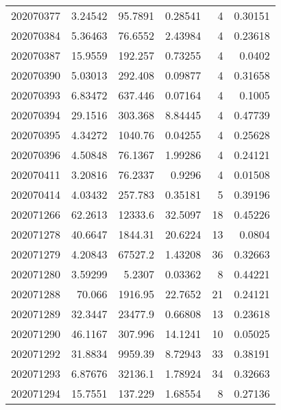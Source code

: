 \begin{tabular}{rrrrrr}
 202070377 &          3.24542 &       95.7891 &            0.28541 &           4 & 0.30151 \\
 202070384 &          5.36463 &       76.6552 &            2.43984 &           4 & 0.23618 \\
 202070387 &         15.9559  &      192.257  &            0.73255 &           4 & 0.0402  \\
 202070390 &          5.03013 &      292.408  &            0.09877 &           4 & 0.31658 \\
 202070393 &          6.83472 &      637.446  &            0.07164 &           4 & 0.1005  \\
 202070394 &         29.1516  &      303.368  &            8.84445 &           4 & 0.47739 \\
 202070395 &          4.34272 &     1040.76   &            0.04255 &           4 & 0.25628 \\
 202070396 &          4.50848 &       76.1367 &            1.99286 &           4 & 0.24121 \\
 202070411 &          3.20816 &       76.2337 &            0.9296  &           4 & 0.01508 \\
 202070414 &          4.03432 &      257.783  &            0.35181 &           5 & 0.39196 \\
 202071266 &         62.2613  &    12333.6    &           32.5097  &          18 & 0.45226 \\
 202071278 &         40.6647  &     1844.31   &           20.6224  &          13 & 0.0804  \\
 202071279 &          4.20843 &    67527.2    &            1.43208 &          36 & 0.32663 \\
 202071280 &          3.59299 &        5.2307 &            0.03362 &           8 & 0.44221 \\
 202071288 &         70.066   &     1916.95   &           22.7652  &          21 & 0.24121 \\
 202071289 &         32.3447  &    23477.9    &            0.66808 &          13 & 0.23618 \\
 202071290 &         46.1167  &      307.996  &           14.1241  &          10 & 0.05025 \\
 202071292 &         31.8834  &     9959.39   &            8.72943 &          33 & 0.38191 \\
 202071293 &          6.87676 &    32136.1    &            1.78924 &          34 & 0.32663 \\
 202071294 &         15.7551  &      137.229  &            1.68554 &           8 & 0.27136 \\

\end{tabular}
